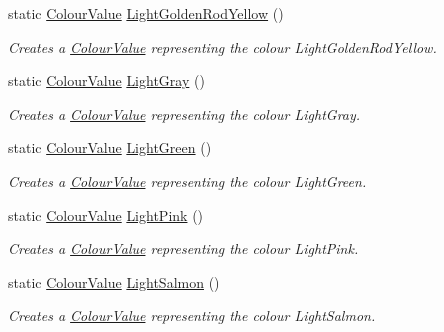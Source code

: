 \begin{DoxyCompactItemize}
static \hyperlink{classMezzanine_1_1ColourValue}{ColourValue} \hyperlink{classMezzanine_1_1ColourValue_a181deeda2ee871ee60ceea440ab50a61}{LightGoldenRodYellow} ()
\begin{DoxyCompactList}\small\item\em Creates a \hyperlink{classMezzanine_1_1ColourValue}{ColourValue} representing the colour LightGoldenRodYellow. \item\end{DoxyCompactList}\item 
static \hyperlink{classMezzanine_1_1ColourValue}{ColourValue} \hyperlink{classMezzanine_1_1ColourValue_ae310d564cc41f0f920a38372aa784f16}{LightGray} ()
\begin{DoxyCompactList}\small\item\em Creates a \hyperlink{classMezzanine_1_1ColourValue}{ColourValue} representing the colour LightGray. \item\end{DoxyCompactList}\item 
static \hyperlink{classMezzanine_1_1ColourValue}{ColourValue} \hyperlink{classMezzanine_1_1ColourValue_a4ba88982a52ec3b70f077782bcc177fa}{LightGreen} ()
\begin{DoxyCompactList}\small\item\em Creates a \hyperlink{classMezzanine_1_1ColourValue}{ColourValue} representing the colour LightGreen. \item\end{DoxyCompactList}\item 
static \hyperlink{classMezzanine_1_1ColourValue}{ColourValue} \hyperlink{classMezzanine_1_1ColourValue_a59ab42d7b7397fba68809ab0e4e9dcdd}{LightPink} ()
\begin{DoxyCompactList}\small\item\em Creates a \hyperlink{classMezzanine_1_1ColourValue}{ColourValue} representing the colour LightPink. \item\end{DoxyCompactList}\item 
static \hyperlink{classMezzanine_1_1ColourValue}{ColourValue} \hyperlink{classMezzanine_1_1ColourValue_a5b03b63b2f01079b3949ce61cbfd5494}{LightSalmon} ()
\begin{DoxyCompactList}\small\item\em Creates a \hyperlink{classMezzanine_1_1ColourValue}{ColourValue} representing the colour LightSalmon. \item\end{DoxyCompactList}\item 

\end{DoxyCompactItemize}

